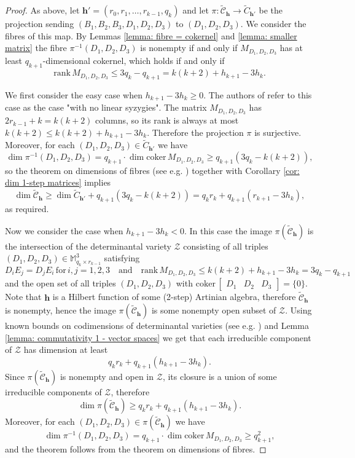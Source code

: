 \documentclass[11pt]{amsart}
\theoremstyle{definition}
\newcommand{\h}{\mathbf{h}}
\newcommand{\tC}{\widetilde{C}}
\newcommand{\tcC}{\widetilde{\mathscr{C}}}
\begin{document}
\begin{proof}
As above, let $\h'=(r_0,r_1,\ldots ,r_{k-1},q_k)$ and let $\pi\colon \tcC_\h\to \tC_{\h'}$ be the projection sending $(B_1,B_2,B_3,D_1,D_2,D_3)$ to $(D_1,D_2,D_3)$. We consider the fibres of this map. By Lemmas \ref{lemma: fibre = cokernel} and \ref{lemma: smaller matrix} the fibre $\pi^{-1}(D_1,D_2,D_3)$ is nonempty if and only if $M_{D_1,D_2,D_3}$ has at least $q_{k+1}$-dimensional cokernel, which holds if and only if
$$\mathrm{rank}\, M_{D_1,D_2,D_3}\le 3q_k-q_{k+1}=k(k+2)+h_{k+1}-3h_k.$$

We first consider the easy case when $h_{k+1}-3h_k\ge 0$. The authors of \cite{GGGL} refer to this case as the case "with no linear syzygies". The matrix $M_{D_1,D_2,D_3}$ has $2r_{k-1}+k=k(k+2)$ columns, so its rank is always at most $k(k+2)\le k(k+2)+h_{k+1}-3h_k$. Therefore the projection $\pi$ is surjective. Moreover, for each $(D_1,D_2,D_3)\in \tC_{\h'}$ we have
$$\dim \pi^{-1}(D_1,D_2,D_3)=q_{k+1}\cdot \dim \mathrm{coker}\, M_{D_1,D_2,D_3}\ge q_{k+1}(3q_k-k(k+2)),$$
so the theorem on dimensions of fibres (see e.g. \cite[Theorem 11.12]{Har}) together with Corollary \ref{cor: dim 1-step matrices} implies
$$\dim \tcC_\h\ge \dim \tC_{\h'}+q_{k+1}(3q_k-k(k+2))=q_kr_k+q_{k+1}(r_{k+1}-3h_k),$$
as required.

Now we consider the case when $h_{k+1}-3h_k<0$. In this case the image $\pi(\tcC_\h)$ is the intersection of the determinantal variety $\mathcal{Z}$ consisting of all triples $(D_1,D_2,D_3)\in \mathbb{M}_{q_k\times r_{k-1}}^3$ satisfying
$$D_iE_j=D_jE_i\, \mathrm{for}\, i,j=1,2,3\quad \mathrm{and}\quad \mathrm{rank}\, M_{D_1,D_2,D_3}\le k(k+2)+h_{k+1}-3h_k=3q_k-q_{k+1}$$
and the open set of all triples $(D_1,D_2,D_3)$ with $\mathrm{coker}\, \begin{bmatrix}D_1 & D_2 & D_3\end{bmatrix}=\{0\}$. Note that $\h$ is a Hilbert function of some (2-step) Artinian algebra, therefore $\tcC_\h$ is nonempty, hence the image $\pi(\tcC_\h)$ is some nonempty open subset of $\mathcal{Z}$. Using known bounds on codimensions of determinantal varieties (see e.g. \cite[Exercise 10.9]{Eis}) and Lemma \ref{lemma: commutativity 1 - vector spaces} we get that each irreducible component of $\mathcal{Z}$ has dimension at least
$$q_kr_k+q_{k+1}(h_{k+1}-3h_k).$$
Since $\pi(\tcC_\h)$ is nonempty and open in $\mathcal{Z}$, its closure is a union of some irreducible components of $\mathcal{Z}$, therefore
$$\dim \pi(\tcC_\h)\ge q_kr_k+q_{k+1}(h_{k+1}-3h_k).$$
Moreover, for each $(D_1,D_2,D_3)\in \pi(\tcC_\h)$ we have
$$\dim \pi^{-1}(D_1,D_2,D_3)=q_{k+1}\cdot \dim \mathrm{coker}\, M_{D_1,D_2,D_3}\ge q_{k+1}^2,$$
and the theorem follows from the theorem on dimensions of fibres.
\end{proof}
\end{document}
